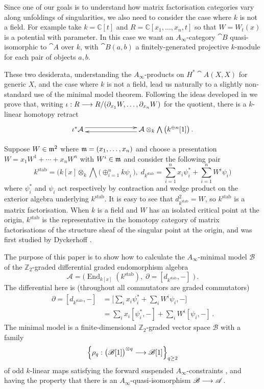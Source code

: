 \documentclass[english,letter paper,12pt,leqno]{article}
\theoremstyle{example}
\numberwithin{equation}{section}
\def\stab{\operatorname{stab}}
\def\be{\begin{equation}}
\def\ee{\end{equation}}
\def\nZ{\mathds{Z}}
\DeclareMathOperator{\End}{End}
\begin{document}
Since one of our goals is to understand how matrix factorisation categories vary along unfoldings of singularities, we also need to consider the case where $k$ is not a field. For example take $k = \mathbb{C}[t]$ and $R = \mathbb{C}[x_1,\ldots,x_n, t]$ so that $W = W_t(x)$ is a potential with parameter. In this case we want an $A_\infty$-category $\cat{B}$ quasi-isomorphic to $\cat{A}$ over $k$, with $\cat{B}(a,b)$ a finitely-generated projective $k$-module for each pair of objects $a,b$. 
\vspace{0.2cm}

These two desiderata, understanding the $A_\infty$-products on $H^*\cat{A}(X,X)$ for generic $X$, and the case where $k$ is not a field, lead us naturally to a slightly non-standard use of the minimal model theorem. Following the ideas developed in \cite{??,??,??} we prove that, writing $\iota: R \longrightarrow R/(\partial_{x_1} W, \ldots, \partial_{x_n} W)$ for the quotient, there is a $k$-linear homotopy retract
\be\label{eq:intro_he}
\xymatrix@C+4pc{
\iota^* \cat{A} \ar@<0.7ex>[r] & \cat{A} \otimes_k \bigwedge\big( k^{\oplus n}[1] \big) \ar@<0.7ex>[l]\,.
}
\ee

Suppose $W \in \mathfrak{m}^2$ where $\mathfrak{m} = (x_1,\ldots,x_n)$ and choose a presentation $W = x_1 W^1 + \cdots + x_n W^n$ with $W^i \in \mathfrak{m}$ and consider the following pair
\begin{equation}\label{eq:kstab}
k^{\operatorname{stab}} = \Big( k[x] \otimes_k \bigwedge\big( \oplus_{i=1}^n k\psi_i \,\big), \;d_{k^{\stab}} = \sum_{i=1}^n x_i \psi_i^* + \sum_{i=1}^n W^i \psi_i \Big)
\end{equation}
where $\psi_i^*$ and $\psi_i$ act respectively by contraction and wedge product on the exterior algebra underlying $k^{\stab}$. It is easy to see that $d_{k^{\stab}}^2 = W$, so $k^{\stab}$ is a matrix factorisation. When $k$ is a field and $W$ has an isolated critical point at the origin, $k^{\stab}$ is the representative in the homotopy category of matrix factorisations of the structure sheaf of the singular point at the origin, and was first studied by Dyckerhoff \cite{d0904.4713}. 

The purpose of this paper is to show how to calculate the $A_\infty$-minimal model $\mathscr{B}$ of the $\nZ_2$-graded differential graded endomorphism algebra
\be\label{eq:defnaw}
\mathscr{A} = \Big( \End_{k[x]}(k^{\operatorname{stab}}), \; \partial = [d_{k^{\stab}},-] \; \Big)\,.
\ee 
The differential here is (throughout all commutators are graded commutators)
\begin{align*}
\partial = [d_{k^{\stab}},-] &= \Big[\sum_i x_i \psi_i^* + \sum_i W^i \psi_i, -\Big]\\
&= \sum_i x_i [\psi_i^*,-] + \sum_i W^i [\psi_i,-]\,.
\end{align*}
The minimal model is a finite-dimensional $\nZ_2$-graded vector space $\mathscr{B}$ with a family 
\[
\left\{ \rho_q: \big(\mathscr{B}[1]\big)^{\otimes q} \longrightarrow \mathscr{B}[1] \right\}_{q \ge 2}
\]
of odd $k$-linear maps satisfying the forward suspended $A_\infty$-constraints \cite{lazaroiu}, and having the property that there is an $A_\infty$-quasi-isomorphism $\mathscr{B} \longrightarrow \mathscr{A}$.
\end{document}
